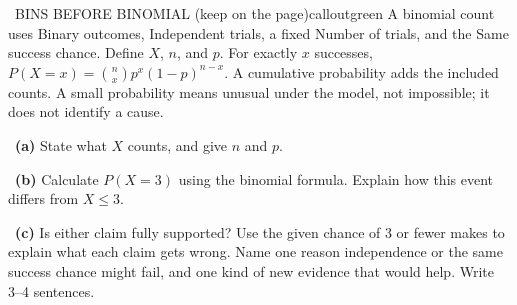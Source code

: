 \documentclass[11pt]{article}
\begin{document}
\begin{callout}{\IconBook\ BINS BEFORE BINOMIAL (keep on the page)}{calloutgreen}
A binomial count uses Binary outcomes, Independent trials, a fixed Number of trials, and the Same success chance. Define $X$, $n$, and $p$. For exactly $x$ successes, $P(X=x)=\binom{n}{x}p^x(1-p)^{n-x}$. A cumulative probability adds the included counts. A small probability means unusual under the model, not impossible; it does not identify a cause.
\end{callout}

~\textbf{(a)} State what $X$ counts, and give $n$ and $p$.\par
{}

~\textbf{(b)} Calculate $P(X=3)$ using the binomial formula. Explain how this event differs from $X\leq3$.\par
{}

~\textbf{(c)} Is either claim fully supported? Use the given chance of 3 or fewer makes to explain what each claim gets wrong. Name one reason independence or the same success chance might fail, and one kind of new evidence that would help. Write 3--4 sentences.\par
{}
\end{document}
